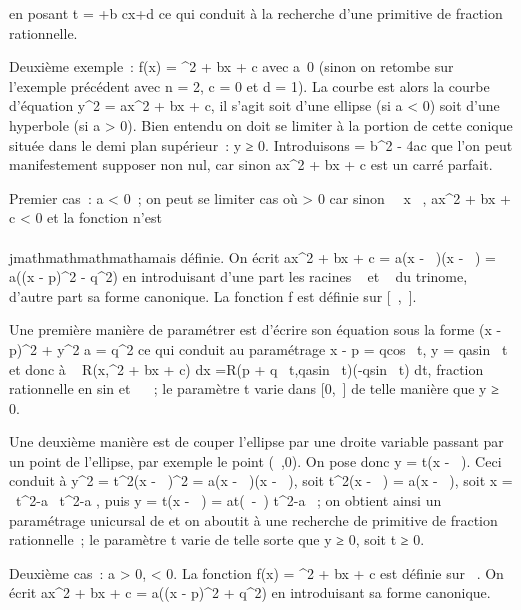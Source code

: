 en posant t = \rootn \ofax+b
\over cx+d  ce qui conduit à la recherche d'une
primitive de fraction rationnelle.

Deuxième exemple~: f(x) = \sqrtax^2  + bx +
c avec a\neq~0 (sinon on retombe sur l'exemple
précédent avec n = 2, c = 0 et d = 1). La courbe \Gamma est alors la courbe
d'équation y^2 = ax^2 + bx + c, il s'agit soit
d'une ellipse (si a \textless{} 0) soit d'une hyperbole (si a
\textgreater{} 0). Bien entendu on doit se limiter à la portion de cette
conique située dans le demi plan supérieur~: y ≥ 0. Introduisons \Delta =
b^2 - 4ac que l'on peut manifestement supposer non nul, car
sinon ax^2 + bx + c est un carré parfait.

Premier cas~: a \textless{} 0~; on peut se limiter cas où \Delta
\textgreater{} 0 car sinon \forall~~x \in {}~,
ax^2 + bx + c \textless{} 0 et la fonction n'est \\\\jmathmathmathmathamais
définie. On écrit ax^2 + bx + c = a(x - \alpha~)(x - \beta~) = a((x -
p)^2 - q^2) en introduisant d'une part les racines \alpha~
et \beta~ du trinome, d'autre part sa forme canonique. La fonction f est
définie sur {[}\alpha~,\beta~{]}.

Une première manière de paramétrer \Gamma est d'écrire son équation sous la
forme (x - p)^2 + y^2 \over
\textbar{}a\textbar{} = q^2 ce qui conduit au paramétrage x
- p = qcos~ t, y =
q\sqrt\textbar{}a\textbar{}sin~
t et donc à \int ~
R(x,\sqrtax^2  + bx + c) dx
=\int  R(p + q\cos~
t,q\sqrt\textbar{}a\textbar{}sin~
t)(-qsin~ t) dt, fraction rationnelle en
sin et \cos~ ~; le
paramètre t varie dans {[}0,\pi~{]} de telle manière que y ≥ 0.

Une deuxième manière est de couper l'ellipse \Gamma par une droite variable
passant par un point de l'ellipse, par exemple le point (\alpha~,0). On pose
donc y = t(x - \alpha~). Ceci conduit à y^2 = t^2(x -
\alpha~)^2 = a(x - \alpha~)(x - \beta~), soit t^2(x - \alpha~) = a(x - \beta~),
soit x = \alpha~t^2-a\beta~ \over t^2-a ,
puis y = t(x - \alpha~) = at(\beta~-\alpha~) \over t^2-a ~;
on obtient ainsi un paramétrage unicursal de \Gamma et on aboutit à une
recherche de primitive de fraction rationnelle~; le paramètre t varie de
telle sorte que y ≥ 0, soit t ≥ 0.

Deuxième cas~: a \textgreater{} 0, \Delta \textless{} 0. La fonction f(x) =
\sqrtax^2  + bx + c est définie sur ~. On
écrit ax^2 + bx + c = a((x - p)^2 +
q^2) en introduisant sa forme canonique.

